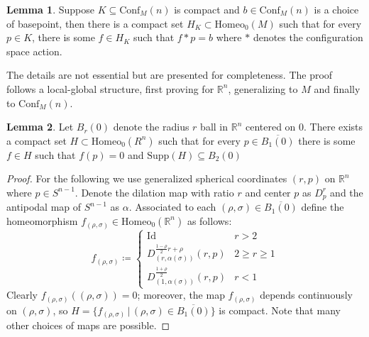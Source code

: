 \documentclass[10pt, oneside]{article}
\newcommand{\R}{\mathbb{R}}
\newcommand{\homeo}[1][S^1]{\text{Homeo}_0(#1)}
\newcommand{\cl}[1]{\overline{#1}}
\newcommand{\conf}[2][S^1]{\text{Conf}_{#2}(#1)}
\theoremstyle{definition}
\newtheorem{lem}{Lemma}[section]
\theoremstyle{definition}
\begin{document}
\begin{lem}\label{lem:cpct-to-basepoint-confM}
    Suppose $K\subseteq\conf[n]{M}$ is compact and $b\in\conf[n]{M}$ is a choice of basepoint, then there is a compact set $H_K\subset\homeo[M]$ such that for every $p\in K$, there is some $f\in H_K$ such that $f*p=b$ where $*$ denotes the configuration space action.
\end{lem}

The details are not essential but are presented for completeness. The proof follows a local-global structure, first proving for $\R^n$, generalizing to $M$ and finally to $\conf[n]{M}$.

\begin{lem}
    Let $B_r(0)$ denote the radius $r$ ball in $\R^n$ centered on 0. There exists a compact set $H\subset\homeo[R^n]$ such that for every $p\in \cl{B_1(0)}$ there is some $f\in H$ such that $f(p)=0$ and $\text{Supp}(H) \subseteq B_2(0)$
\end{lem}
\begin{proof}
    For the following we use generalized spherical coordinates $(r, p)$ on $\R^n$ where $p\in S^{n-1}$. Denote the dilation map with ratio $r$ and center $p$ as $D_p^r$ and the antipodal map of $S^{n-1}$ as $\alpha$. Associated to each $(\rho, \sigma)\in \cl{B_1(0)}$ define the homeomorphism $f_{(\rho, \sigma)}\in\homeo[\R^n]$ as follows:
    \[f_{(\rho,\sigma)} \coloneqq
    \begin{cases}
        \text{Id} & r>2\\[.8em]
        D_{(r,\alpha(\sigma))}^{\frac{1-\rho}{2}r+\rho}(r,p) & 2\geq r \geq 1 \\[1em]
        D_{(1, \alpha(\sigma))}^{\frac{1+\rho}{2}}(r,p) & r < 1
    \end{cases}
    \]
    Clearly $f_{(\rho, \sigma)}((\rho,\sigma))=0$; moreover, the map $f_{(\rho,\sigma)}$ depends continuously on $(\rho,\sigma)$, so $H=\{f_{(\rho,\sigma)}\,\vert\, (\rho,\sigma)\in\cl{B_1(0)}\}$ is compact.
    Note that many other choices of maps are possible.
\end{proof}
\end{document}
